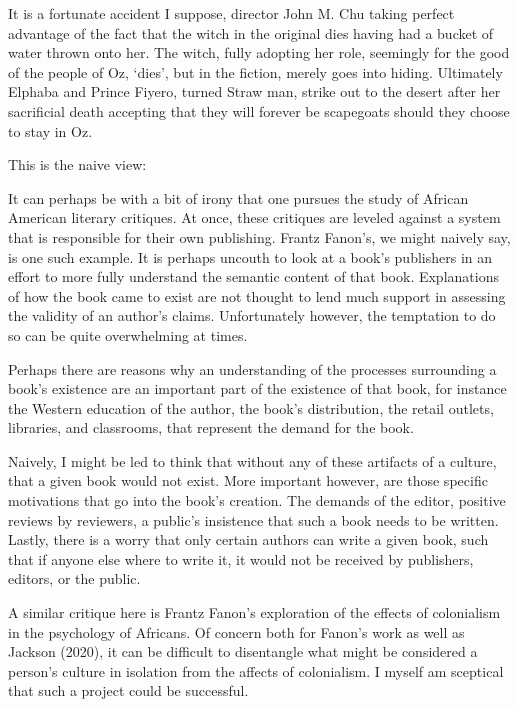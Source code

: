 \documentclass[
  letterpaper,
  DIV=11,
  numbers=noendperiod]{scrreprt}
\begin{document}
\begin{tcolorbox}[enhanced jigsaw, arc=.35mm, breakable, rightrule=.15mm, colback=white, colframe=quarto-callout-important-color-frame, bottomrule=.15mm, leftrule=.75mm, opacityback=0, toprule=.15mm, left=2mm]
\begin{tcolorbox}[enhanced jigsaw, arc=.35mm, breakable, rightrule=.15mm, colback=white, colframe=quarto-callout-tip-color-frame, bottomrule=.15mm, leftrule=.75mm, opacityback=0, toprule=.15mm, left=2mm]
It is a fortunate accident I suppose, director John M. Chu taking
perfect advantage of the fact that the witch in the original dies having
had a bucket of water thrown onto her. The witch, fully adopting her
role, seemingly for the good of the people of Oz, `dies', but in the
fiction, merely goes into hiding. Ultimately Elphaba and Prince Fiyero,
turned Straw man, strike out to the desert after her sacrificial death
accepting that they will forever be scapegoats should they choose to
stay in Oz.

This is the naive view:

It can perhaps be with a bit of irony that one pursues the study of
African American literary critiques. At once, these critiques are
leveled against a system that is responsible for their own publishing.
Frantz Fanon's, we might naively say, is one such example. It is perhaps
uncouth to look at a book's publishers in an effort to more fully
understand the semantic content of that book. Explanations of how the
book came to exist are not thought to lend much support in assessing the
validity of an author's claims. Unfortunately however, the temptation to
do so can be quite overwhelming at times.

Perhaps there are reasons why an understanding of the processes
surrounding a book's existence are an important part of the existence of
that book, for instance the Western education of the author, the book's
distribution, the retail outlets, libraries, and classrooms, that
represent the demand for the book.

Naively, I might be led to think that without any of these artifacts of
a culture, that a given book would not exist. More important however,
are those specific motivations that go into the book's creation. The
demands of the editor, positive reviews by reviewers, a public's
insistence that such a book needs to be written. Lastly, there is a
worry that only certain authors can write a given book, such that if
anyone else where to write it, it would not be received by publishers,
editors, or the public.

A similar critique here is Frantz Fanon's exploration of the effects of
colonialism in the psychology of Africans. Of concern both for Fanon's
work as well as Jackson (2020), it can be difficult to disentangle what
might be considered a person's culture in isolation from the affects of
colonialism. I myself am sceptical that such a project could be
successful.


\end{tcolorbox}
\end{tcolorbox}
\end{document}
